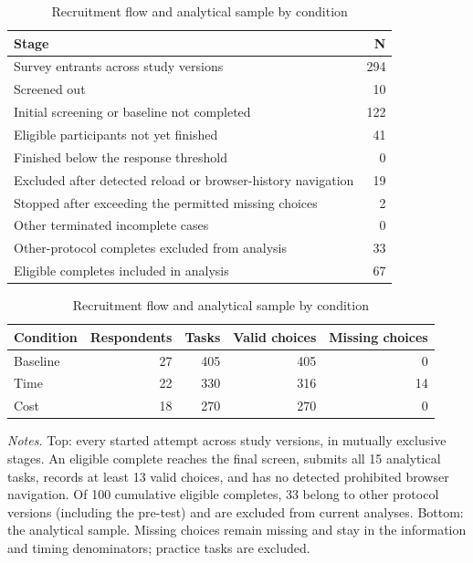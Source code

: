 \documentclass[11pt]{article}\usepackage[]{graphicx}\usepackage[]{xcolor}
\newenvironment{notes}{\par\smallskip\begin{minipage}{\linewidth}\footnotesize\textit{Notes.}}{\end{minipage}}
\begin{document}
\begin{table}[!htbp]
\centering\small
\caption{Recruitment flow and analytical sample by condition}
\label{tab:recruitment}
\begin{tabular}{@{}lr@{}}
\toprule
Stage & N \\
\midrule
Survey entrants across study versions & 294 \\
Screened out & 10 \\
Initial screening or baseline not completed & 122 \\
Eligible participants not yet finished & 41 \\
Finished below the response threshold & 0 \\
Excluded after detected reload or browser-history navigation & 19 \\
Stopped after exceeding the permitted missing choices & 2 \\
Other terminated incomplete cases & 0 \\
Other-protocol completes excluded from analysis & 33 \\
Eligible completes included in analysis & 67 \\
\bottomrule
\end{tabular}

\par\medskip
\begin{tabular}{@{}lrrrr@{}}
\toprule
Condition & Respondents & Tasks & Valid choices & Missing choices \\
\midrule
Baseline & 27 & 405 & 405 & 0 \\
Time & 22 & 330 & 316 & 14 \\
Cost & 18 & 270 & 270 & 0 \\
\bottomrule
\end{tabular}

\begin{notes}
Top: every started attempt across study versions, in mutually exclusive stages. An eligible complete reaches the final screen, submits all 15 analytical tasks, records at least 13 valid choices, and has no detected prohibited browser navigation. Of 100 cumulative eligible completes, 33 belong to other protocol versions (including the pre-test) and are excluded from current analyses. Bottom: the analytical sample. Missing choices remain missing and stay in the information and timing denominators; practice tasks are excluded.
\end{notes}
\end{table}
\end{document}
